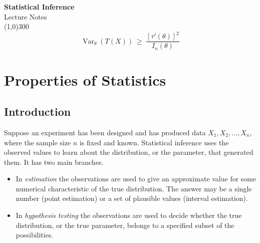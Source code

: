 \documentclass[12pt,a4paper]{report}
\theoremstyle{definition}
\begin{document}
\begin{titlepage}
\thispagestyle{empty}
\begin{center}
\vspace*{3cm}
{\Huge\bfseries Statistical Inference}\\[1.2cm]
{\large Lecture Notes}\\[2.5cm]
\line(1,0){300}\\[1.5cm]
\[\operatorname{Var}_{\theta}(T(X))\ \geq\ \frac{[\tau'(\theta)]^2}{I_n(\theta)}\]
\end{center}
\end{titlepage}









\tableofcontents
\thispagestyle{empty}
\clearpage
\setcounter{page}{1}



















\chapter{Properties of Statistics}

\section{Introduction}

Suppose an experiment has been designed and has produced data
$X_1, X_2, \dots, X_n$, where the sample size $n$ is fixed and known. Statistical
inference uses the observed values to learn about the distribution, or the
parameter, that generated them. It has two main branches.
\begin{itemize}
\item In \emph{estimation} the observations are used to give an approximate value
for some numerical characteristic of the true distribution. The answer may be a
single number (point estimation) or a set of plausible values (interval
estimation).
\item In \emph{hypothesis testing} the observations are used to decide whether
the true distribution, or the true parameter, belongs to a specified subset of
the possibilities.
\end{itemize}
\end{document}
